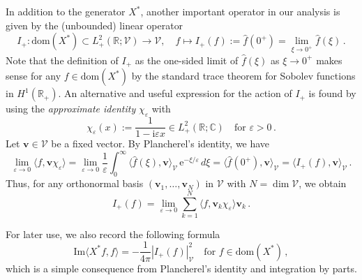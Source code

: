 \documentclass[11pt,reqno]{amsart}
\theoremstyle{definition}
\theoremstyle{remark}
\theoremstyle{remark}
\numberwithin{equation}{section}
\newcommand{\C}{\mathbb{C}}
\newcommand{\R}{\mathbb{R}}
\newcommand{\VV}{\mathcal{V}}
\newcommand{\dom}{\mathrm{dom}}
\newcommand{\be}{\begin{equation}}
\newcommand{\ee}{\end{equation}}
\newcommand{\eps}{\varepsilon}
\newcommand{\ii}{\mathrm{i}}
\newcommand{\eu}{\mathrm{e}}
\renewcommand{\Im}{\mathrm{Im}}
\newcommand{\vv}{\mathbf{v}}
\begin{document}
\medskip
In addition to the generator $X^*$, another important operator in our analysis is given by the (unbounded) linear operator
$$
I_+ : \dom(X^*) \subset L^2_+(\R; \VV) \to \VV, \quad f \mapsto I_+(f):= \widehat{f}(0^+) = \lim_{\xi \to 0^+} \widehat{f}(\xi) \, .
$$
Note that the definition of $I_+$ as the one-sided limit of $\widehat{f}(\xi)$ as $\xi \to 0^+$ makes sense for any $f \in \dom(X^*)$ by the standard trace theorem for Sobolev functions in $H^1(\R_+)$. An alternative and useful expression for the action of $I_+$ is found by using the {\em approximate identity} $\chi_\eps$ with
$$
\chi_\eps(x) := \frac{1}{1- \ii \eps x} \in L^2_+(\R; \C) \quad \mbox{for $\eps > 0$} \, .
$$
Let $\mathbf{v} \in \VV$ be a fixed vector. By Plancherel's identity, we have
$$
\lim_{\eps \to 0} \langle f, \mathbf{v} \chi_\eps \rangle = \lim_{\eps \to 0} \frac{1}{\eps} \int_0^\infty \langle \widehat{f}(\xi), \mathbf{v}    \rangle_\VV \,  \eu^{-\xi/\eps} \, d \xi = \langle \widehat{f}(0^+), \mathbf{v} \rangle_\VV = \langle I_+(f), \vv \rangle_\VV \, .
$$
Thus, for any orthonormal basis $(\vv_1, \ldots, \vv_N)$ in $\VV$ with $N = \dim \VV$, we  obtain
\be \label{eq:I_ident}
I_+(f) = \lim_{\eps \to 0} \sum_{k=1}^{N}   \langle f, \vv_k \chi_\eps \rangle \vv_k \, .
\ee

For later use, we also record the following formula
\be \label{eq:G_I}
\Im  \langle X^* f, f \rangle = -\frac{1}{4 \pi} | I_+(f)|^2_\VV \quad \mbox{for $f \in \dom(X^*)$} \, ,
\ee
which is a simple consequence from Plancherel's identity and integration by parts. 
\end{document}
